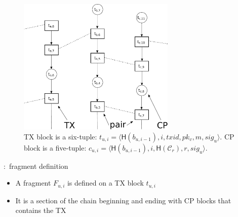 \documentclass{beamer}
\newcommand{\C}{\mathcal{C}}
\begin{document}
\begin{frame}{\subsecname}
  \begin{figure}[h]
  \includegraphics[width=0.67\textwidth]{trustchain-good-cp}
  \centering
  \caption{TX block is a six-tuple: $t_{u, i} = \langle \textsf{H}(b_{u, i - 1}), i, txid, pk_v, m, sig_u \rangle$.
    CP block is a five-tuple: $c_{u, i} = \langle \textsf{H}(b_{u, i-1}), i, \textsf{H}(\C_r), r, sig_u \rangle$.}
  \end{figure}
\end{frame}

\begin{frame}{\subsecname:~fragment definition}
\begin{itemize}
\item A fragment $F_{u, i}$ is defined on a TX block $t_{u, i}$
\item It is a section of the chain beginning and ending with CP blocks that contains the TX
\end{itemize}
\end{frame}
\end{document}
